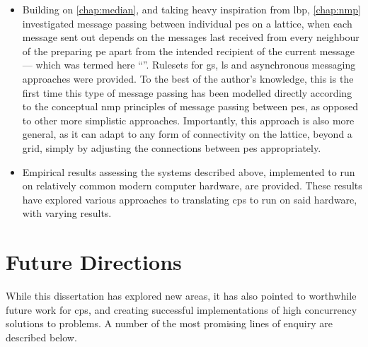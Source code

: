 \begin{itemize}
    \item Building on \cref{chap:median}, and taking heavy inspiration from \gls{lbp}, \cref{chap:nmp} investigated message passing between individual \glspl{pe} on a lattice, when each message sent out depends on the messages last received from every neighbour of the preparing \gls{pe} apart from the intended recipient of the current message --- which was termed here ``''.  Rulesets for \gls{gs}, \gls{ls} and asynchronous messaging approaches were provided.  To the best of the author's knowledge, this is the first time this type of message passing has been modelled directly according to the conceptual \gls{nmp} principles of message passing between \glspl{pe}, as opposed to other more simplistic approaches.  Importantly, this approach is also more general, as it can adapt to any form of connectivity on the lattice, beyond a grid, simply by adjusting the connections between \glspl{pe} appropriately.
    \item Empirical results assessing the systems described above, implemented to run on relatively common modern computer hardware, are provided.  These results have explored various approaches to translating \gls{cps} to run on said hardware, with varying results.
\end{itemize}

\section{Future Directions}

While this dissertation has explored new areas, it has also pointed to worthwhile future work for \gls{cps}, and creating successful implementations of high concurrency solutions to problems.  A number of the most promising lines of enquiry are described below.



